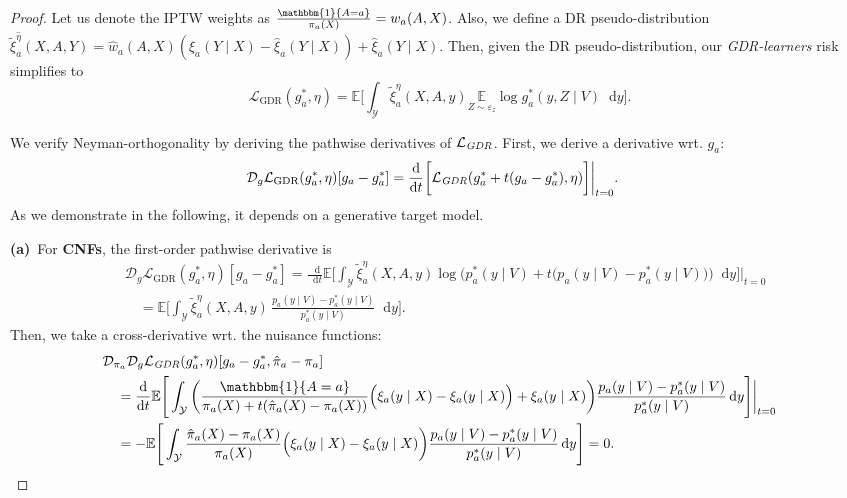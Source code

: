 \documentclass[dvipsnames]{article} %
\newcommand*\diff{\mathop{}\!\mathrm{d}}
\newcommand{\GDRlearners}{\emph{GDR-learners}\xspace}
\begin{document}
\begin{proof}
    Let us denote the IPTW weights as $\frac{\mathbbm{1}\{A = a\}} {\pi_a(X)} = w_a(A, X)$. Also, we define a DR pseudo-distribution $\tilde{\xi}^{\hat{\eta}}_a(X, A, Y) = \hat{w}_a(A, X)(\xi_a(Y \mid X) - \hat{\xi}_a(Y \mid X)) + \hat{\xi}_a(Y \mid X) $. Then, given the DR pseudo-distribution, our \GDRlearners risk simplifies to
    \begin{equation}
        \mathcal{L}_\text{{GDR}}({g}_a^*, {\eta}) = \mathbb{E} \bigg[\int_{\mathcal{Y}}\tilde{\xi}^{{\eta}}_a(X, A, y) \underset{Z \sim \varepsilon_z }{\mathbb{E}} \log g_a^*(y, Z \mid V) \diff y \bigg].
    \end{equation}
    
    We verify Neyman-orthogonality by deriving the pathwise derivatives of $\mathcal{L}_\text{\emph{GDR}}$. First, we derive a derivative wrt. $g_a$:
    \begin{align}
        & \mathcal{D}_g\mathcal{L}_\text{{GDR}}(g_a^*, \eta)[g_a - g_a^*]= \frac{\diff}{\diff t} \bigg[ \mathcal{L}_\text{\emph{GDR}}(g_a^* + t ({g}_a - g_a^*), \eta)\bigg]\bigg|_{t=0}.
     \end{align}
    As we demonstrate in the following, it depends on a generative target model.

    \textbf{(a)}~For \textbf{CNFs},  the first-order pathwise derivative is
     \begingroup\makeatletter\def\f@size{8}\check@mathfonts
    \begin{align}
        &  \mathcal{D}_g\mathcal{L}_\text{{GDR}}(g_a^*, \eta)[g_a - g_a^*] =  \frac{\diff}{\diff t} \mathbb{E}\Bigg[ \int_{\mathcal{Y}}\tilde{\xi}^{{\eta}}_a(X, A, y) \log \Big(p_a^*(y \mid V) + t \big({p}_a(y \mid V) - p_a^*(y \mid V) \big)\Big) \diff y \Bigg]\bigg|_{t=0} \\
        & \quad  =  \mathbb{E}\Bigg[ \int_{\mathcal{Y}}\tilde{\xi}^{{\eta}}_a(X, A, y) \, \frac{{p}_a(y \mid V) - p_a^*(y \mid V)}{p_a^*(y \mid V)} \diff y \Bigg].
    \end{align}
    \endgroup
    Then, we take a cross-derivative wrt. the nuisance functions:
    \begingroup\makeatletter\def\f@size{8}\check@mathfonts
    \begin{align}
        & \mathcal{D}_{\pi_a} \mathcal{D}_g\mathcal{L}_\text{\emph{GDR}}(g_a^*, \eta)[g_a - g_a^*, \hat{\pi}_a - \pi_a] \\
        & \quad =  \frac{\diff}{\diff t} \mathbb{E}\Bigg[ \int_{\mathcal{Y}} \bigg(\frac{\mathbbm{1}\{A = a\}}{\pi_a(X) + t(\hat{\pi}_a(X) - \pi_a(X))} \Big(\xi_a(y \mid X) - {\xi}_a(y \mid X) \Big) + {\xi}_a(y \mid X) \bigg) \frac{p_a(y \mid V) - p_a^*(y \mid V)}{p_a^*(y \mid V)} \diff y \Bigg]\bigg|_{t=0} \nonumber\\
        & \quad = - \mathbb{E}\Bigg[ \int_{\mathcal{Y}} \frac{\hat{\pi}_a(X) - \pi_a(X)}{\pi_a(X)} \Big(\xi_a(y \mid X) - {\xi}_a(y \mid X) \bigg) \frac{p_a(y \mid V) - p_a^*(y \mid V)}{p_a^*(y \mid V)} \diff y \Bigg] = 0.
    \end{align}
    \endgroup


\end{proof}
\end{document}
